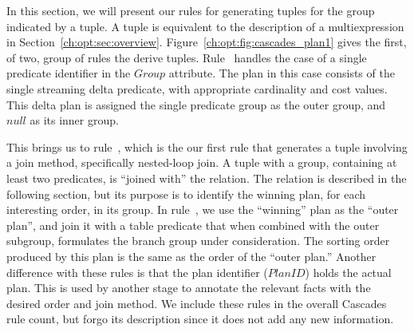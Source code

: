 In this section, we will present our rules for generating  tuples for
the group indicated by a  tuple.  A  tuple is equivalent to
the description of a multiexpression in Section~\ref{ch:opt:sec:overview}.
Figure~\ref{ch:opt:fig:cascades_plan1} gives the first, of two, group of rules
the derive  tuples.  Rule~ handles the case of a single
predicate identifier in the $Group$ attribute.  The plan in this case consists
of the single streaming delta predicate, with appropriate cardinality and cost
values.  This delta plan is assigned the single predicate group as the outer
group, and $null$ as its inner group.

This brings us to rule~, which is the our first rule that generates a
 tuple involving a join method, specifically nested-loop join.  A
 tuple with a group, containing at least two predicates, is ``joined
with'' the  relation.  The  relation is described in the
following section, but its purpose is to identify the winning plan, for each
interesting order, in its group.  In rule~, we use the ``winning'' plan
as the ``outer plan'', and join it with a table predicate that when combined
with the outer subgroup, formulates the branch group under consideration.  The
sorting order produced by this plan is the same as the order of the ``outer
plan.'' Another difference with these rules is that the plan identifier
($PlanID$) holds the actual plan.  This is used by another stage to annotate
the relevant  facts with the desired order and join method.
We include these rules in the overall Cascades rule count, but forgo its
description since it does not add any new information.

